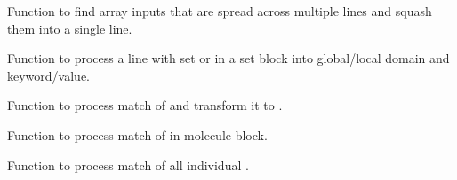 \documentclass[letterpaper,10pt,english]{sphinxmanual}
\begin{document}

\begin{fulllineitems}
\label{index:input.process_multiline_arrays}
Function to find array inputs that are spread across multiple
lines and squash them into a single line.

\end{fulllineitems}


\begin{fulllineitems}
\label{index:input.process_option}
Function to process a line with set or in a set block
into global/local domain and keyword/value.

\end{fulllineitems}


\begin{fulllineitems}
\label{index:input.process_print_command}
Function to process match of  and transform
it to .

\end{fulllineitems}


\begin{fulllineitems}
\label{index:input.process_pubchem_command}
Function to process match of  in molecule block.

\end{fulllineitems}


\begin{fulllineitems}
\label{index:input.process_set_command}
Function to process match of all individual .

\end{fulllineitems}
\end{document}
